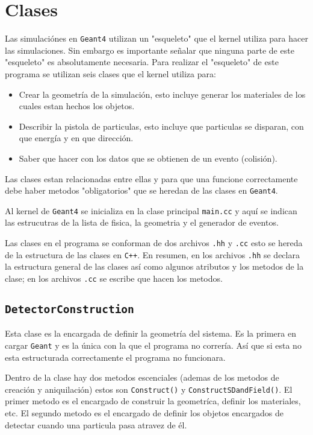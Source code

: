 \documentclass[a4paper,10pt]{article}
\begin{document}
    \section{Clases}
        Las simulaciónes en \verb|Geant4| utilizan un "esqueleto" que el kernel utiliza para hacer las simulaciones. Sin embargo es importante señalar que ninguna parte de este "esqueleto" es absolutamente necesaria.
	Para realizar el "esqueleto" de este programa se utilizan seis clases que el kernel utiliza para:
	
	\begin{itemize}
		\item Crear la geometría de la simulación, esto incluye generar los materiales de los cuales estan hechos los objetos.
		\item Describir la pistola de particulas, esto incluye que particulas se disparan, con que energía y en que dirección.
		\item Saber que hacer con los datos que se obtienen de un evento (colisión).
	\end{itemize}

	Las clases estan relacionadas entre ellas y para que una funcione correctamente debe haber metodos "obligatorios" que se heredan de las clases en \verb|Geant4|.

	Al kernel de \verb|Geant4| se inicializa en la clase principal \verb|main.cc| y aquí se indican las estrucutras de la lista de fisica, la geometria y el generador de eventos.

	Las clases en el programa se conforman de dos archivos \verb|.hh| y \verb|.cc| esto se hereda de la estructura de las clases en \verb|C++|. En resumen, en los archivos \verb|.hh| se declara la estructura general de las clases así como algunos atributos y los metodos de la clase; en los archivos \verb|.cc| se escribe que hacen los metodos.
	
	\subsection{\verb|DetectorConstruction|}

		Esta clase es la encargada de definir la geometría del sistema. Es la primera en cargar \verb|Geant| y es la única con la que el programa no correría. Así que si esta no esta estructurada correctamente el programa no funcionara.
		
		Dentro de la clase hay dos metodos escenciales (ademas de los metodos de creación y aniquilación) estos son \verb|Construct()| y \verb|ConstructSDandField()|. El primer metodo es el encargado de construir la geometríca, definir los materiales, etc. El segundo metodo es el encargado de definir los objetos encargados de detectar cuando una particula pasa atravez de él.
\end{document}

